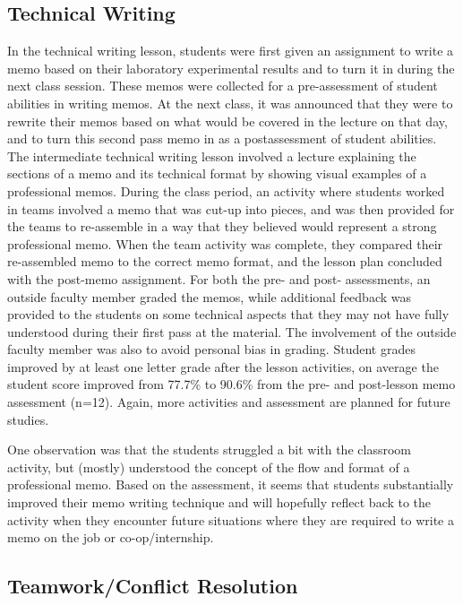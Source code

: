 \documentclass[11.5pt]{sig-alternate} %
\begin{document}
\begin{large}
\subsection*{Technical Writing}

In the technical writing lesson, students were first given an assignment to write a memo based on their laboratory experimental results and to turn it in during the next class session. These memos were collected for a pre-assessment of student abilities in writing memos. At the next class, it was announced that they were to rewrite their memos based on what would be covered in the lecture on that day, and to turn this second pass memo in as a postassessment of student abilities. The intermediate technical writing lesson involved a lecture explaining the sections of a memo and its technical format by showing visual examples of a professional memos. During the class period, an activity where students worked in teams involved a memo that was cut-up into pieces, and was then provided for the teams to re-assemble in a way that they believed would represent a strong professional memo. When the team activity was complete, they compared their re-assembled memo to the correct memo format, and the lesson plan concluded with the post-memo assignment. For both the pre- and post- assessments, an outside faculty member graded the memos, while additional feedback was provided to the students on some technical aspects that they may not have fully understood during their first pass at the material. The involvement of the outside faculty member was also to avoid personal bias in grading. Student grades improved by at least one letter grade after the lesson activities, on average the student score improved from 77.7\% to 90.6\% from the pre- and post-lesson memo assessment (n=12). Again, more activities and assessment are planned for future studies.

One observation was that the students struggled a bit with the classroom activity, but (mostly) understood the concept of the flow and format of a professional memo. Based on the assessment, it seems that students substantially improved their memo writing technique and will hopefully reflect back to the activity when they encounter future situations where they are required to write a memo on the job or co-op/internship.

\subsection*{Teamwork/Conflict Resolution}


\end{large}
\end{document}

